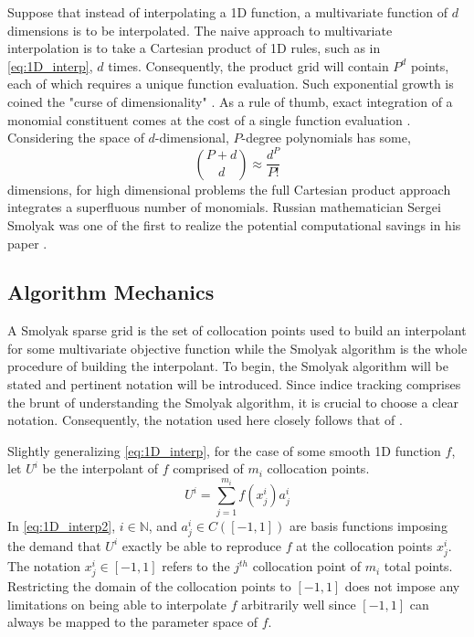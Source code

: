 Suppose that instead of interpolating a 1D function, a multivariate function of $d$ dimensions is to be interpolated. The naive approach to multivariate interpolation is to take a Cartesian product of 1D rules, such as in \ref{eq:1D_interp}, $d$ times. Consequently, the product grid will contain $P^d$ points, each of which requires a unique function evaluation. Such exponential growth is coined the "curse of dimensionality" \cite{LeMaitreKnio}. As a rule of thumb, exact integration of a monomial constituent comes at the cost of a single function evaluation \cite{Burkardt_SCALA2013}. Considering the space of $d$-dimensional, $P$-degree polynomials has some,
\begin{equation} \label{eq:polynomial_space}
    \binom{P+d}{d} \approx \frac{d^P}{P!} 
\end{equation} 
dimensions, for high dimensional problems the full Cartesian product approach integrates a superfluous number of monomials. Russian mathematician Sergei Smolyak was one of the first to realize the potential computational savings in his paper \cite{SmolyakOriginal}.

\subsection{Algorithm Mechanics} \label{subsec:algorithm_mechanics}

A Smolyak sparse grid is the set of collocation points used to build an interpolant for some multivariate objective function while the Smolyak algorithm is the whole procedure of building the interpolant. To begin, the Smolyak algorithm will be stated and pertinent notation will be introduced. Since indice tracking comprises the brunt of understanding the Smolyak algorithm, it is crucial to choose a clear notation. Consequently, the notation used here closely follows that of \cite{NovakRitter}.

Slightly generalizing \ref{eq:1D_interp}, for the case of some smooth 1D function $f$, let $U^i$ be the interpolant of $f$ comprised of $m_i$ collocation points.
\begin{equation} \label{eq:1D_interp2}
    U^i = \sum_{j=1}^{m_i} 
     f\left(x_j^i\right) a_j^i
\end{equation}  
In \ref{eq:1D_interp2}, $i \in \mathbb{N}$, and $a_j^i \in C(\left[-1,1\right])$ are basis functions imposing the demand that $U^i$ exactly be able to reproduce $f$ at the collocation points $x_j^i$. The notation $x_j^i \in \left[-1,1\right]$ refers to the $j^{th}$ collocation point of $m_i$ total points. Restricting the domain of the collocation points to $\left[-1,1\right]$ does not impose any limitations on being able to interpolate $f$ arbitrarily well since $\left[-1,1\right]$ can always be mapped to the parameter space of $f$.

